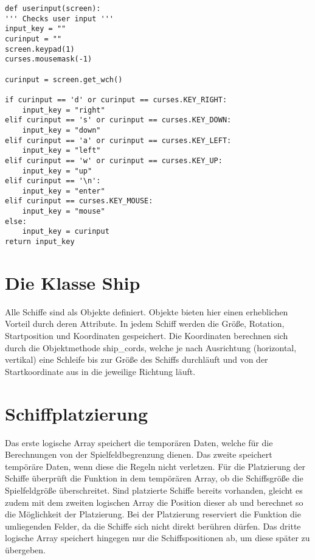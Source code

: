 \documentclass{llncs}
\begin{document}
\lstset{
caption=Funktion userinput() nimmt Eingaben des Benutzers an}
\begin{lstlisting}
def userinput(screen):
''' Checks user input '''
input_key = ""
curinput = ""
screen.keypad(1)
curses.mousemask(-1)

curinput = screen.get_wch()

if curinput == 'd' or curinput == curses.KEY_RIGHT:
    input_key = "right"
elif curinput == 's' or curinput == curses.KEY_DOWN:
    input_key = "down"
elif curinput == 'a' or curinput == curses.KEY_LEFT:
    input_key = "left"
elif curinput == 'w' or curinput == curses.KEY_UP:
    input_key = "up"
elif curinput == '\n':
    input_key = "enter"
elif curinput == curses.KEY_MOUSE:
    input_key = "mouse"
else: 
    input_key = curinput
return input_key
\end{lstlisting}

\section{Die Klasse Ship}

Alle Schiffe sind als Objekte definiert. Objekte bieten hier einen erheblichen Vorteil durch deren Attribute.
In jedem Schiff werden die Größe, Rotation, Startposition und Koordinaten gespeichert. Die Koordinaten berechnen sich durch die Objektmethode \glqq ship\_cords\grqq{}, welche 
je nach Ausrichtung (horizontal, vertikal) eine Schleife bis zur Größe des Schiffs durchläuft und von der Startkoordinate aus in die jeweilige Richtung läuft.

\section{Schiffplatzierung}

Das erste logische Array speichert die temporären Daten, welche für die Berechnungen von der Spielfeldbegrenzung dienen. Das zweite speichert tempöräre Daten, wenn diese die Regeln nicht verletzen.
Für die Platzierung der Schiffe überprüft die Funktion in dem tempörären Array, ob die Schiffsgröße die Spielfeldgröße überschreitet. Sind platzierte Schiffe bereits vorhanden, gleicht es zudem mit dem zweiten logischen
Array die Position dieser ab und berechnet so die Möglichkeit der Platzierung. Bei der Platzierung reserviert die Funktion die umliegenden Felder, da die Schiffe sich nicht direkt berühren dürfen. Das dritte logische 
Array speichert hingegen nur die Schiffspositionen ab, um diese später zu übergeben.
\end{document}
